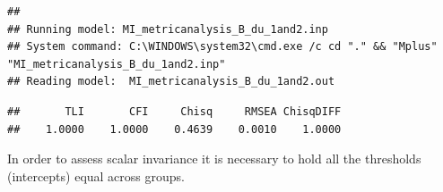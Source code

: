 \documentclass[]{book}
\newenvironment{Shaded}{\begin{snugshade}}{\end{snugshade}}
\newcommand{\DataTypeTok}[1]{\textcolor[rgb]{0.13,0.29,0.53}{#1}}
\newcommand{\KeywordTok}[1]{\textcolor[rgb]{0.13,0.29,0.53}{\textbf{#1}}}
\newcommand{\NormalTok}[1]{#1}
\newcommand{\OperatorTok}[1]{\textcolor[rgb]{0.81,0.36,0.00}{\textbf{#1}}}
\begin{document}
\begin{verbatim}
## 
## Running model: MI_metricanalysis_B_du_1and2.inp 
## System command: C:\WINDOWS\system32\cmd.exe /c cd "." && "Mplus" "MI_metricanalysis_B_du_1and2.inp" 
## Reading model:  MI_metricanalysis_B_du_1and2.out
\end{verbatim}

\begin{Shaded}
\end{Shaded}

\begin{verbatim}
##       TLI       CFI     Chisq     RMSEA ChisqDIFF 
##    1.0000    1.0000    0.4639    0.0010    1.0000
\end{verbatim}

In order to assess scalar invariance it is necessary to hold all the thresholds (intercepts) equal across groups.
\end{document}

